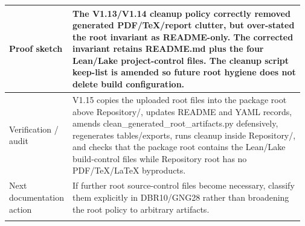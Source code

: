 \begin{longtable}{L{0.16\linewidth} L{0.81\linewidth}}
Proof sketch & The V1.13/\allowbreak{}V1.14 cleanup policy correctly removed generated PDF/\allowbreak{}TeX/\allowbreak{}report clutter, but over-stated the root invariant as README-only. The corrected invariant retains README.md plus the four Lean/\allowbreak{}Lake project-control files. The cleanup script keep-list is amended so future root hygiene does not delete build configuration.\\
\hline\addlinespace[0.20em]
Verification /\allowbreak{} audit & V1.15 copies the uploaded root files into the package root above Repository/\allowbreak{}, updates README and YAML records, amends clean\_generated\_root\_artifacts.py defensively, regenerates tables/\allowbreak{}exports, runs cleanup inside Repository/\allowbreak{}, and checks that the package root contains the Lean/\allowbreak{}Lake build-control files while Repository root has no PDF/\allowbreak{}TeX/\allowbreak{}LaTeX byproducts.\\
\hline\addlinespace[0.20em]
Next documentation action & If further root source-control files become necessary, classify them explicitly in DBR10/\allowbreak{}GNG28 rather than broadening the root policy to arbitrary artifacts.\\
\hline\addlinespace[0.20em]
\end{longtable}
